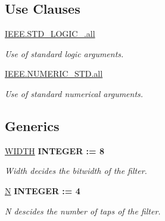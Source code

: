 \subsection*{Use Clauses}
 \begin{DoxyCompactItemize}
\item 
\hypertarget{classdigitalfilter_a68c233289eaf7d2601307bdd93b4c299}{\hyperlink{classdigitalfilter_a68c233289eaf7d2601307bdd93b4c299}{I\-E\-E\-E.\-S\-T\-D\-\_\-\-L\-O\-G\-I\-C\-\_.\-all}   }\label{classdigitalfilter_a68c233289eaf7d2601307bdd93b4c299}

\begin{DoxyCompactList}\small\item\em Use of standard logic arguments. \end{DoxyCompactList}\item 
\hypertarget{classdigitalfilter_a7c135c43c66ccd7f22abe5f6211788a5}{\hyperlink{classdigitalfilter_a7c135c43c66ccd7f22abe5f6211788a5}{I\-E\-E\-E.\-N\-U\-M\-E\-R\-I\-C\-\_\-\-S\-T\-D.\-all}   }\label{classdigitalfilter_a7c135c43c66ccd7f22abe5f6211788a5}

\begin{DoxyCompactList}\small\item\em Use of standard numerical arguments. \end{DoxyCompactList}\end{DoxyCompactItemize}
\subsection*{Generics}
 \begin{DoxyCompactItemize}
\item 
\hypertarget{classdigitalfilter_a91fcbc2cb8dd91f914c30526e23794a9}{\hyperlink{classdigitalfilter_a91fcbc2cb8dd91f914c30526e23794a9}{W\-I\-D\-T\-H} {\bfseries {\bfseries \textcolor{comment}{I\-N\-T\-E\-G\-E\-R}\textcolor{vhdlchar}{ }\textcolor{vhdlchar}{\-:}\textcolor{vhdlchar}{=}\textcolor{vhdlchar}{ } \textcolor{vhdldigit}{8} \textcolor{vhdlchar}{ }}}}\label{classdigitalfilter_a91fcbc2cb8dd91f914c30526e23794a9}

\begin{DoxyCompactList}\small\item\em Width decides the bitwidth of the filter. \end{DoxyCompactList}\item 
\hypertarget{classdigitalfilter_a61de7093f96d3bc9f246d1d7744f9dc6}{\hyperlink{classdigitalfilter_a61de7093f96d3bc9f246d1d7744f9dc6}{N} {\bfseries {\bfseries \textcolor{comment}{I\-N\-T\-E\-G\-E\-R}\textcolor{vhdlchar}{ }\textcolor{vhdlchar}{\-:}\textcolor{vhdlchar}{=}\textcolor{vhdlchar}{ } \textcolor{vhdldigit}{4} \textcolor{vhdlchar}{ }}}}\label{classdigitalfilter_a61de7093f96d3bc9f246d1d7744f9dc6}

\begin{DoxyCompactList}\small\item\em N descides the number of taps of the filter. \end{DoxyCompactList}\end{DoxyCompactItemize}
